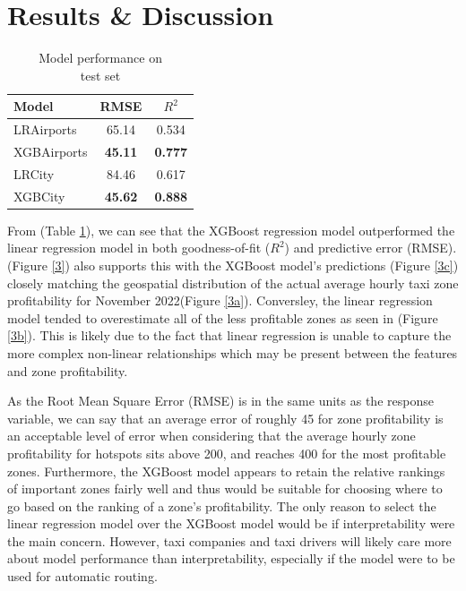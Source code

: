 \documentclass[11pt]{article}
\begin{document}
\section{Results \& Discussion}



\begin{table}
\vspace{-20pt}
\begin{tabular}{lcc} \toprule
    {\textbf{Model}} & {\textbf{RMSE}} & {$R^2$} \\ \midrule
    LRAirports  & 65.14 & 0.534       \\
    XGBAirports  & \textbf{45.11} & \textbf{0.777}  \\ \midrule
    LRCity  & 84.46  & 0.617       \\
    XGBCity  & \textbf{45.62} & \textbf{0.888}    \\ \bottomrule
    
\end{tabular}
\caption{Model performance on \\ test set}
\label{t1}
\end{table}

From (Table \ref{t1}), we can see that the XGBoost regression model outperformed the linear regression model in both goodness-of-fit ($R^2$) and predictive error (RMSE). (Figure \ref{3}) also supports this with the XGBoost model's predictions (Figure \ref{3c}) closely matching the geospatial distribution of the actual average hourly taxi zone profitability for November 2022(Figure \ref{3a}). Conversley, the linear regression model tended to overestimate all of the less profitable zones as seen in (Figure \ref{3b}). This is likely due to the fact that linear regression is unable to capture the more complex non-linear relationships which may be present between the features and zone profitability. 

As the Root Mean Square Error (RMSE) is in the same units as the response variable, we can say that an average error of roughly 45 for zone profitability is an acceptable level of error when considering that the average hourly zone profitability for hotspots sits above 200, and reaches 400 for the most profitable zones. Furthermore, the XGBoost model appears to retain the relative rankings of important zones fairly well and thus would be suitable for choosing where to go based on the ranking of a zone's profitability. The only reason to select the linear regression model over the XGBoost model would be if interpretability were the main concern. However, taxi companies and taxi drivers will likely care more about model performance than interpretability, especially if the model were to be used for automatic routing.
\end{document}
